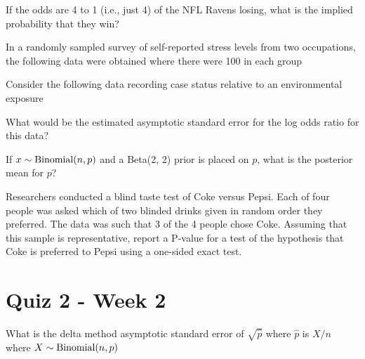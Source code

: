 \documentclass{homework}
\begin{document}
\begin{tcolorbox}[title=Question 2]
If the odds are 4 to 1 (i.e., just 4) of the NFL Ravens losing, what is the implied probability that they win? 
\end{tcolorbox}

\begin{tcolorbox}[title=Question 3]
In a randomly sampled survey of self-reported stress levels from two occupations, the following data were obtained where there were 100 in each group 
\end{tcolorbox}

\begin{tcolorbox}[title=Question 4]
Consider the following data recording case status relative to an environmental exposure


What would be the estimated asymptotic standard error for the log odds ratio for this data?
\end{tcolorbox}

\begin{tcolorbox}[title=Question 5]
If $x \sim \textnormal{Binomial}(n, p)$ and a Beta(2, 2) prior is placed on $p$, what is the posterior mean for $p$?
\end{tcolorbox}

\begin{tcolorbox}[title=Question 6]
Researchers conducted a blind taste test of Coke versus Pepsi. Each of four people was asked which of two blinded drinks given in random order they preferred. The data was such that 3 of the 4 people chose Coke. Assuming that this sample is representative, report a P-value for a test of the hypothesis that Coke is preferred to Pepsi using a one-sided exact test.
\end{tcolorbox}
\clearpage

\section{Quiz 2 - Week 2}

\begin{tcolorbox}[title=Question 1]
What is the delta method asymptotic standard error of $\sqrt{\hat p}$ where $\hat p$ is $X/n$ where $X \sim \textnormal{Binomial}(n, p)$
\end{tcolorbox}
\end{document}
